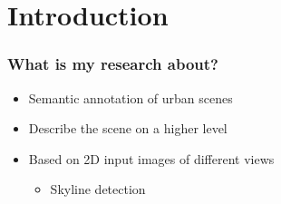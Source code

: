 \documentclass{beamer}
\begin{document}

\section{Introduction}
% 
% 
% 
% 
% 

\frame
{
	\frametitle{What is my research about?}
	\begin{itemize}
	\item <+-| alert@+> Semantic annotation of urban scenes
	\item <+-| alert@+> Describe the scene on a higher level
	\item <+-| alert@+> Based on 2D input images of different views
		\begin{itemize}
			\item <+-| alert@+> Skyline detection
		\end{itemize}
	\end{itemize}
}
\end{document}
